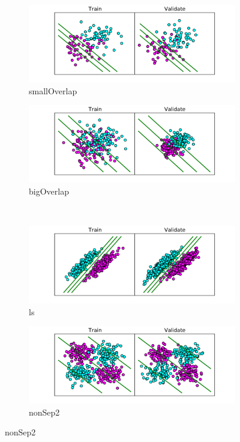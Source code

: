 \documentclass[10pt]{article}
\begin{document}
\begin{figure}[!ht]
\centering
\begin{subfigure}[b]{0.46\textwidth}
	\centering
	\includegraphics[width=\textwidth]{1-2-smallOverlap.pdf}
	\caption{smallOverlap}
	\label{fig:1-2-smalloverlap}
\end{subfigure}
\begin{subfigure}[b]{0.46\textwidth}
	\centering
	\includegraphics[width=\textwidth]{1-2-bigOverlap.pdf}
	\caption{bigOverlap}
	\label{fig:1-2-bigoverlap}
\end{subfigure}
\\
\begin{subfigure}[b]{0.46\textwidth}
	\centering
	\includegraphics[width=\textwidth]{1-2-ls.pdf}
	\caption{ls}
	\label{fig:1-2-ls}
\end{subfigure}
\begin{subfigure}[b]{0.46\textwidth}
	\centering
	\includegraphics[width=\textwidth]{1-2-nonSep2.pdf}
	\caption{nonSep2}
	\label{fig:1-2-nonSep2}
\end{subfigure}
\end{figure}
\end{document}

